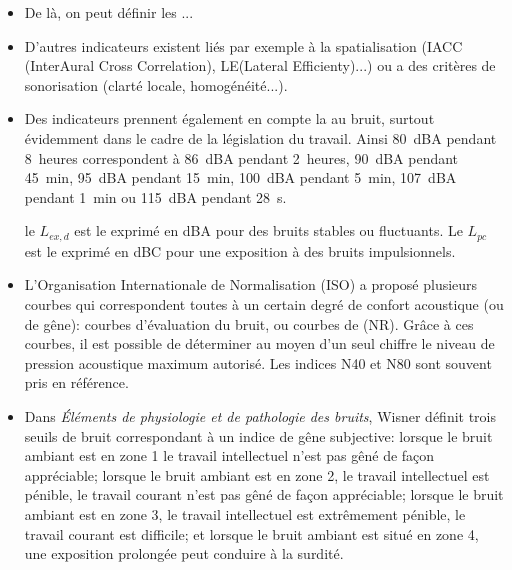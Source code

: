\begin{itemize}
   \item De là, on peut définir les ...
   
   \item D'autres indicateurs existent liés par exemple à la spatialisation (IACC (InterAural Cross Correlation), LE(Lateral Efficienty)...) ou a des critères de sonorisation (clarté locale, homogénéité...).
   
   \item Des indicateurs prennent également en compte la  au bruit, surtout évidemment dans le cadre de la législation du travail.
    Ainsi 80~dBA pendant 8~heures correspondent à 86~dBA pendant 2~heures, 90~dBA pendant 45~min, 95~dBA pendant 15~min, 100~dBA pendant 5~min, 107~dBA pendant 1~min ou 115~dBA pendant 28~s.
    
    le $L_{ex,d}$ est le  exprimé en dBA pour des bruits stables ou fluctuants.
    Le $L_{pc}$ est le  exprimé en dBC pour une exposition à des bruits impulsionnels.
    

   \item L'Organisation Internationale de Normalisation (ISO) a proposé plusieurs courbes qui correspondent toutes à un certain degré de confort acoustique (ou de gêne): courbes d'évaluation du bruit, ou courbes de  (NR). Grâce à ces courbes, il est possible de déterminer au moyen d'un seul chiffre le niveau de pression acoustique maximum autorisé. Les indices N40 et N80 sont souvent pris en référence.

   \item Dans \emph{Éléments de physiologie et de pathologie des bruits}, Wisner définit trois seuils de bruit correspondant à un indice de gêne subjective: lorsque le bruit ambiant est en zone 1 le travail intellectuel n'est pas gêné de façon appréciable; lorsque le bruit ambiant est en zone 2, le travail intellectuel est pénible, le travail courant n'est pas gêné de façon appréciable; lorsque le bruit ambiant est en zone 3, le travail intellectuel est extrêmement pénible, le travail courant est difficile; et lorsque le bruit ambiant est situé en zone 4, une exposition prolongée peut conduire à la surdité.


\end{itemize}
